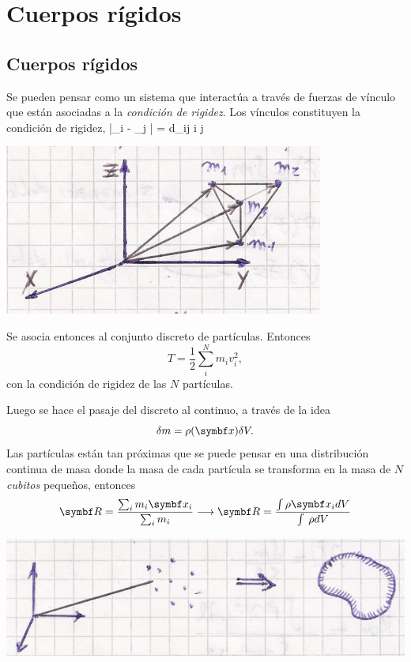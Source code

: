 \documentclass[10pt,oneside]{CBFT_book}
\begin{document}
\chapter{Cuerpos rígidos}

\section{Cuerpos rígidos}

Se pueden pensar como un sistema que interactúa a través de fuerzas de vínculo que están asociadas
a la {\it condición de rigidez}. Los vínculos constituyen la condición de rigidez,
\be
	|_i - _j | = d_{ij}	\qquad i \neq j
\label{vinculos}
\ee

\includegraphics[scale=0.4]{images/fig_mc_rigid_body_1.jpg}

Se asocia entonces al conjunto discreto de partículas. Entonces 
\[
	T = \frac 1 2 \sum_i^N m_i v_i^2, 
\]
con la condición de rigidez de las $N$ partículas.

Luego se hace el pasaje del discreto al continuo, a través de la idea 
\[
	\delta m = \rho(\vb{x}) \delta V.
\]
Las partículas están tan próximas que se puede pensar en una distribución continua de masa 
donde la masa de cada partícula se transforma en la masa de $N$ {\it cubitos} pequeños, entonces 
\[
	\vb{R} = \frac{\sum_i m_i\vb{x}_i}{\sum_i m_i} \longrightarrow 
	\vb{R} = \frac{\int \rho \vb{x}_i dV }{\int \: \rho dV} 
\]

\includegraphics[scale=0.4]{images/fig_mc_rigid_body_2.jpg}
\end{document}
